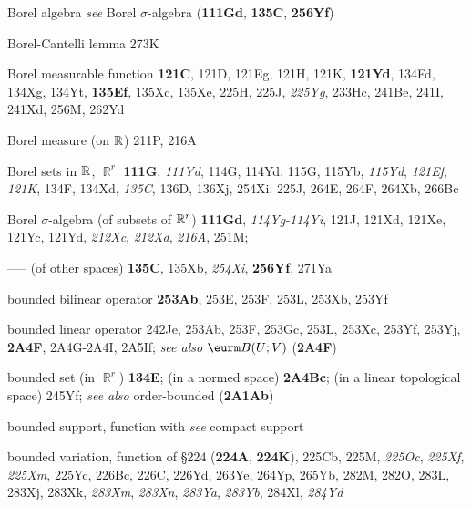 Borel algebra {\it see} Borel $\sigma$-algebra ({\bf 111Gd},
{\bf 135C},
  {\bf 256Yf}) 





Borel-Cantelli lemma 273K


















Borel measurable function {\bf 121C}, 121D, 121Eg, 121H, 121K, {\bf 121Yd}, 134Fd, 134Xg, 134Yt,
{\bf 135Ef}, 135Xc, 135Xe,
  225H, 225J, {\it 225Yg}, 233Hc, 241Be, 241I, 241Xd, 256M, 262Yd

Borel measure 
  (on $\Bbb R$) 211P, 216A 






Borel sets in $\Bbb R$, $\BbbR^r$ {\bf 111G}, {\it 111Yd}, 114G, 114Yd,
115G, 115Yb, {\it 115Yd}, {\it 121Ef}, {\it 121K}, 134F, 134Xd,
{\it 135C}, 136D, 136Xj,
  254Xi, 225J, 264E, 264F, 264Xb, 266Bc
  






Borel $\sigma$-algebra (of subsets of $\Bbb R^r$) {\bf 111Gd},
{\it 114Yg-114Yi}, 
121J, 121Xd, 121Xe, 121Yc, 121Yd,
  {\it 212Xc}, {\it 212Xd}, {\it 216A}, 251M;

----- (of other spaces) {\bf 135C}, 135Xb,
  {\it 254Xi}, {\bf 256Yf}, 271Ya






bounded bilinear operator {\bf 253Ab}, 253E, 253F, 253L, 253Xb,
253Yf


bounded linear operator 242Je, 253Ab, 253F, 253Gc, 253L, 253Xc,
253Yf, 253Yj, {\bf 2A4F}, 2A4G-2A4I, 
2A5If;  
  {\it see also}  $\eurm B(U;V)$ ({\bf 2A4F})



bounded set (in $\BbbR^r$) {\bf 134E};
  (in a normed space) {\bf 2A4Bc};
  (in a linear topological space) 245Yf; 
  {\it see also} order-bounded ({\bf 2A1Ab})
  

bounded support, function with
{\it see} compact support


bounded variation, function of \S224 ({\bf 224A}, {\bf 224K}), 225Cb, 225M,
{\it 225Oc}, {\it 225Xf}, {\it 225Xm}, 225Yc, 226Bc, 226C,
226Yd, 263Ye, 264Yp, 265Yb, 282M, 282O, 283L, 283Xj, 283Xk, {\it 283Xm},
{\it 283Xn}, {\it 283Ya}, {\it 283Yb}, 284Xl, {\it 284Yd}


